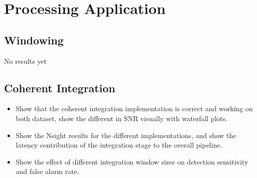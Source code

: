 \section{Processing Application}
\subsection{Windowing}
No results yet

\subsection{Coherent Integration}
\begin{itemize}
    \item Show that the coherent integration implementation is correct and working on both dataset, show the different in SNR visually with waterfall plots. 
    \item Show the Nsight results for the different implementations, and show the latency contribution of the integration stage to the overall pipeline.
    \item Show the effect of different integration window sizes on detection sensitivity and false alarm rate.  
\end{itemize}

